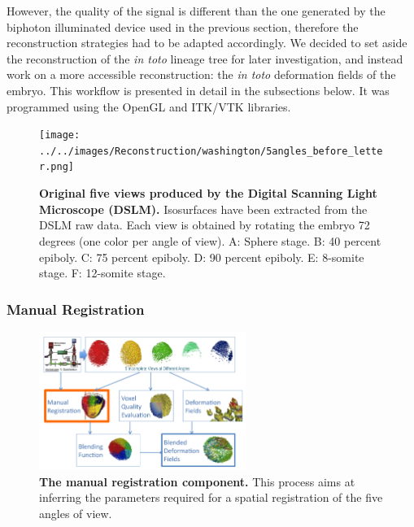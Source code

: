   However, the quality of the signal is different than the one generated by the biphoton illuminated device used in the previous section, therefore the reconstruction strategies had to be adapted accordingly. We decided to set aside the reconstruction of the \textit{in toto} lineage tree for later investigation, and instead work on a more accessible reconstruction: the \textit{in toto} deformation fields of the embryo. This workflow is presented in detail in the subsections below. It was programmed using the OpenGL and ITK/VTK libraries. 
\begin{figure}
\begin{center}
\texttt{[image: ../../images/Reconstruction/washington/5angles\_before\_letter.png]}
\end{center}
\caption{\textbf{Original five views produced by the Digital Scanning Light Microscope (DSLM).} Isosurfaces have been extracted from the DSLM raw data. Each view is obtained by rotating the embryo 72 degrees (one color per angle of view). A: Sphere stage. B: 40 percent epiboly. C: 75 percent epiboly. D: 90 percent epiboly. E: 8-somite stage. F: 12-somite stage.}
\label{washington_5angles_before}
\end{figure}

\subsubsection{Manual Registration  }
\begin{figure}
\begin{center}
\includegraphics[width=0.6\textwidth]{../../images/Reconstruction/washington/workflow_manual_corrected.png}
\end{center}
\caption{\textbf{The manual registration component.} This process aims at inferring the parameters required for a spatial registration of the five angles of view. }
\label{washington_workflow_manual}
\end{figure}

